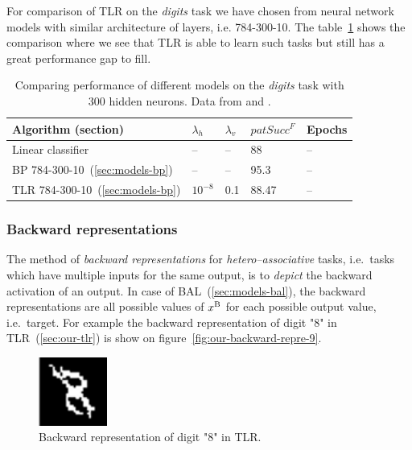 For comparison of TLR on the \emph{digits} task we have chosen from \citet{digits2014mnist} neural network models with similar architecture of layers, i.e. 784-300-10. The table~\ref{tab:results-cmp-digits} shows the comparison where we see that TLR is able to learn such tasks but still has a great performance gap to fill. 

\begin{table}[H] 
  \centering
    \begin{tabular}{|l|l|l|l|l|}
    \hline
    Algorithm (section)&$\lambda_h$&$\lambda_v$&$patSucc^F$ &Epochs\\ %
    \hline
    Linear classifier & -- & -- & 88 & -- \\ %
    \hline
    BP 784-300-10~(\ref{sec:models-bp})& -- & -- & 95.3 & -- \\ %
    \hline 
    TLR 784-300-10~(\ref{sec:models-bp})& $10^{-8}$ & 0.1 & 88.47 & -- \\ %
    \hline 
    \end{tabular}
  \caption{Comparing performance of different models on the \emph{digits} task with 300 hidden neurons. Data from \citet{lecun1998gradient} and \citet{digits2014mnist}.} 
  \label{tab:results-cmp-digits}
\end{table}

\subsubsection{Backward representations} 
\label{sec:our-backward-repre}

The method of \emph{backward representations} for \emph{hetero--associative} tasks, i.e.~tasks which have multiple inputs for the same output, is to \emph{depict} the backward activation of an output. In case of BAL~(\ref{sec:models-bal}), the backward representations are all possible values of $x^{\rm B}$ for each possible output value, i.e.~target. For example the backward representation of digit "8" in TLR~(\ref{sec:our-tlr}) is show on figure~\ref{fig:our-backward-repre-9}. 

\begin{figure}[H]
  \centering
  \includegraphics[width=0.2\textwidth]{img/tlr-digit-8.png} 
  \caption{Backward representation of digit "8" in TLR.}
  \label{fig:our-backward-repre-8}
\end{figure}

